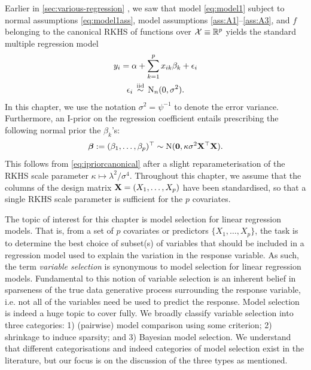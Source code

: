 \documentclass[showframe,11pt,twoside,openright]{report}
\begin{document}
\label{chapter6}

Earlier in \cref{sec:various-regression} , we saw that model \cref{eq:model1} subject to normal assumptions \cref{eq:model1ass}, model assumptions \ref{ass:A1}--\ref{ass:A3}, and $f$ belonging to the canonical RKHS of functions over ${\mathcal X} \equiv \mathbb{R}^p$ yields the standard multiple regression model
\begin{align}\label{eq:linmod}
  \begin{gathered}
    y_i = \alpha + \sum_{k=1}^p x_{ik}\beta_k + \epsilon_i \\
    \epsilon_i \,\overset{\text{iid}}{\sim}\, \operatorname{N}_n(0, \sigma^2).
  \end{gathered}  
\end{align}
In this chapter, we use the notation $\sigma^2 = \psi^{-1}$ to denote the error variance.
Furthermore, an I-prior on the regression coefficient entails prescribing the following normal prior the $\beta_k$'s:
\[
  {\bm\beta} := (\beta_1,\dots,\beta_p)^\top \sim \operatorname{N} ({\mathbf 0},  \kappa \sigma^2 \mathbf X^\top \mathbf X).
\]
This follows from \cref{eq:ipriorcanonical} after a slight reparameterisation of the RKHS scale parameter $\kappa \mapsto \lambda^2/\sigma^4$. 
Throughout this chapter, we assume that the columns of the design matrix ${\mathbf X} = (X_1,\dots,X_p)$ have been standardised, so that a single RKHS scale parameter is sufficient for the $p$ covariates.

The topic of interest for this chapter is model selection for linear regression models.
That is, from a set of $p$ covariates or predictors $\{X_1,\dots,X_p\}$, the task is to determine the best choice of subset(s) of variables that should be included in a regression model used to explain the variation in the response variable.
As such, the term \emph{variable selection} is synonymous to model selection for linear regression models.
Fundamental to this notion of variable selection is an inherent belief in sparseness of the true data generative process surrounding the response variable, i.e. not all of the variables need be used to predict the response.
Model selection is indeed a huge topic to cover fully.
We broadly classify variable selection into three categories: 1) (pairwise) model comparison using some criterion; 2) shrinkage to induce sparsity; and 3) Bayesian model selection.
We understand that different categorisations and indeed categories of model selection exist in the literature, but our focus is on the discussion of the three types as mentioned.
\end{document}
